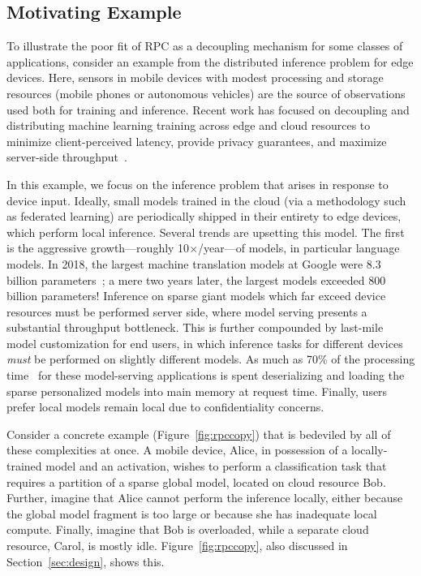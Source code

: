 \subsection*{Motivating Example}

To illustrate the poor fit of RPC as a decoupling mechanism for some classes of applications,
consider an example from the distributed inference problem for edge devices. Here,
sensors in mobile devices with modest processing and storage resources (\eg mobile phones
or autonomous vehicles) are the source of observations used both for training and inference.
Recent work has focused on decoupling and distributing machine learning training across edge
and cloud resources to minimize client-perceived latency, provide privacy guarantees, and
maximize server-side throughput~\cite{federatedml,singh2019detailed}.

In this example, we focus on the inference problem that arises in response to device input.
Ideally, small models trained in the
cloud (via a methodology such as federated learning) are periodically shipped in their entirety to
edge devices, which perform local inference.  Several trends are upsetting this model. The first
is the aggressive growth---roughly 10$\times$/year---of models, in particular language models.
In 2018, the largest machine translation models at Google were 8.3 billion
parameters~\cite{megatron}; a mere two years later, the largest models exceeded 800 billion parameters!
Inference on sparse giant models which far exceed device resources must be performed server
side, where model serving presents a substantial throughput bottleneck. This is further
compounded by last-mile model customization for end users, in which inference tasks
for different devices \emph{must} be performed on slightly different models.  As much as 70\%
of the processing time~\cite{trims} for these model-serving applications is spent deserializing
and loading the sparse personalized models into main memory at request time. Finally, users prefer
local models remain local due to confidentiality concerns.

Consider a concrete example (Figure~\ref{fig:rpccopy}) that is bedeviled by all of these complexities at once. A mobile device,
Alice, in possession of a locally-trained model and an activation, wishes to perform a
classification task that requires a partition of a sparse global model, located on cloud resource
Bob. Further, imagine that Alice cannot perform the inference locally, either because the global
model fragment is too large or because she has inadequate local compute. Finally, imagine that Bob
is overloaded, while a separate cloud resource, Carol, is mostly idle.
Figure~\ref{fig:rpccopy}, also discussed in Section~\ref{sec:design}, shows this.


